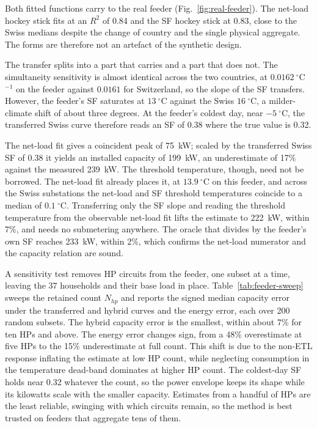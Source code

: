 \documentclass[9pt,journal,a4]{IEEEtran}
\begin{document}
Both fitted functions carry to the real feeder (Fig.~\ref{fig:real-feeder}). The net-load hockey stick fits at an $R^2$ of 0.84 and the SF hockey stick at 0.83, close to the Swiss medians despite the change of country and the single physical aggregate. The forms are therefore not an artefact of the synthetic design.

The transfer splits into a part that carries and a part that does not. The simultaneity sensitivity is almost identical across the two countries, at $0.0162~^\circ$C$^{-1}$ on the feeder against $0.0161$ for Switzerland, so the slope of the SF transfers. However, the feeder's SF saturates at $13~^\circ$C against the Swiss $16~^\circ$C, a milder-climate shift of about three degrees. At the feeder's coldest day, near $-5~^\circ$C, the transferred Swiss curve therefore reads an SF of 0.38 where the true value is 0.32.

The net-load fit gives a coincident peak of 75~kW; scaled by the transferred Swiss SF of 0.38 it yields an installed capacity of 199~kW, an underestimate of 17\% against the measured 239~kW. The threshold temperature, though, need not be borrowed. The net-load fit already places it, at $13.9~^\circ$C on this feeder, and across the Swiss substations the net-load and SF threshold temperatures coincide to a median of $0.1~^\circ$C. Transferring only the SF slope and reading the threshold temperature from the observable net-load fit lifts the estimate to 222~kW, within 7\%, and needs no submetering anywhere. The oracle that divides by the feeder's own SF reaches 233~kW, within 2\%, which confirms the net-load numerator and the capacity relation are sound.

A sensitivity test removes HP circuits from the feeder, one subset at a time, leaving the 37 households and their base load in place. Table~\ref{tab:feeder-sweep} sweeps the retained count $N_{hp}$ and reports the signed median capacity error under the transferred and hybrid curves and the energy error, each over 200 random subsets. The hybrid capacity error is the smallest, within about 7\% for ten HPs and above. The energy error changes sign, from a 48\% overestimate at five HPs to the 15\% underestimate at full count. This shift is due to the non-ETL response inflating the estimate at low HP count, while neglecting consumption in the temperature dead-band dominates at higher HP count. The coldest-day SF holds near 0.32 whatever the count, so the power envelope keeps its shape while its kilowatts scale with the smaller capacity. Estimates from a handful of HPs are the least reliable, swinging with which circuits remain, so the method is best trusted on feeders that aggregate tens of them.
\end{document}
